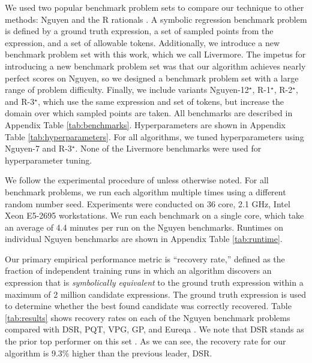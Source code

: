 \documentclass{article}
\begin{document}
We used two popular benchmark problem sets to compare our technique to other methods: Nguyen \citep{nguyen2014bench} and the R rationals \citep{krawiec2012geometric}.
A symbolic regression benchmark problem is defined by a ground truth expression, a set of sampled points from the expression, and a set of allowable tokens.
Additionally, we introduce a new benchmark problem set with this work, which we call Livermore.
The impetus for introducing a new benchmark problem set was that our algorithm achieves nearly perfect scores on Nguyen, so we designed a benchmark problem set with a large range of problem difficulty.
Finally, we include variants Nguyen-12$^\star$, R-1$^\star$, R-2$^\star$, and R-3$^\star$, which use the same expression and set of tokens, but increase the domain over which sampled points are taken.
All benchmarks are described in Appendix Table \ref{tab:benchmarks}.
Hyperparameters are shown in Appendix Table \ref{tab:hyperparameters}.
For all algorithms, we tuned hyperparameters using Nguyen-7 and R-3$^\star$.
None of the Livermore benchmarks were used for hyperparameter tuning. 

We follow the experimental procedure of \citet{petersen2019deep} unless otherwise noted.
For all benchmark problems, we run each algorithm multiple times using a different random number seed.
Experiments were conducted on 36 core, 2.1 GHz, Intel Xeon E5-2695 workstations.
We run each benchmark on a single core, which take an average of 4.4 minutes per run on the Nguyen benchmarks.
Runtimes on individual Nguyen benchmarks are shown in Appendix Table \ref{tab:runtime}.

Our primary empirical performance metric is ``recovery rate,'' defined as the fraction of independent training runs in which an algorithm discovers an expression that is \textit{symbolically equivalent} to the ground truth expression within a maximum of 2 million candidate expressions.
The ground truth expression is used to determine whether the best found candidate was correctly recovered.
Table \ref{tab:results} shows recovery rates on each of the Nguyen benchmark problems compared with DSR, PQT, VPG, GP, and Eureqa \citep{schmidt2009distilling}.
We note that DSR stands as the prior top performer on this set \citep{petersen2019deep}.
As we can see, the recovery rate for our algorithm is 9.3\% higher than the previous leader, DSR.
\end{document}
